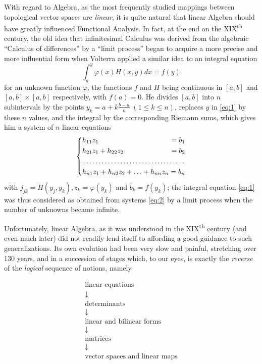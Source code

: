 \documentclass[12pt,a4paper,leqno,twoside]{extbook}
\newcommand{\supth}{\texorpdfstring{\textsuperscript{th}}{th}}
\begin{document}
With regard to Algebra, as the most frequently studied mappings between topological vector spaces are \emph{linear}, it is quite natural that linear Algebra should have greatly influenced Functional Analysis. In fact, at the end on the XIX\supth{} century, the old idea that infinitesimal Calculus was derived from the algebraic ``Calculus of differences'' by a ``limit process'' began to acquire a more precise and more influential form when Volterra applied a similar idea to an integral equation
\begin{equation}
    \label{eq:1}
    \int_a^y \varphi(x) H(x,y) dx = f(y)
\end{equation}
for an unknown function \(\varphi\), the functions \(f\) and \(H\) being continuous in \([a,b]\) and \([a,b] \times [a,b]\) respectively, with \(f(a) = 0\). He divides \([a,b]\) into \(n\) subintervals by the points \(y_k = a + k \frac{b-a}{n} \; (1 \leq k \leq n)\), replaces \(y\) in \eqref{eq:1} by these \(n\) values, and the integral by the corresponding Riemann sums, which gives him a system of \(n\) linear equations
\begin{equation}
    \label{eq:2}
    \begin{dcases}
        h_{11} z_1               \hfill = b_1 \\
        h_{21} z_1 + h_{22} z_2  \hfill = b_2 \\
        \dotfill \\
        h_{n1} z_1 + h_{n2} z_2 + \ldots + h_{nn} z_n = b_n
    \end{dcases}
\end{equation}
with \(j_{jk} = H(y_j, y_k), z_k = \varphi(y_k)\) and \(b_k = f(y_k)\); the integral equation \eqref{eq:1} was thus considered as obtained from systems \eqref{eq:2} by a limit process when the number of unknowns became infinite.

Unfortunately, linear Algebra, as it was understood in the XIX\supth{} century (and even much later) did not readily lend itself to affording a good guidance to such generalizations. Its own evolution had been very slow and painful, stretching over 130 years, and in a succession of stages which, to our eyes, is exactly the \emph{reverse} of the \emph{logical} sequence of notions, namely

\[
    \begin{array}{c}
        \text{linear equations} \\
        \downarrow \\
        \text{determinants}\\
        \downarrow \\
        \text{linear and bilinear forms}\\
        \downarrow \\
        \text{matrices} \\
        \downarrow \\
        \text{vector spaces and linear maps}
    \end{array}
\]
\end{document}
